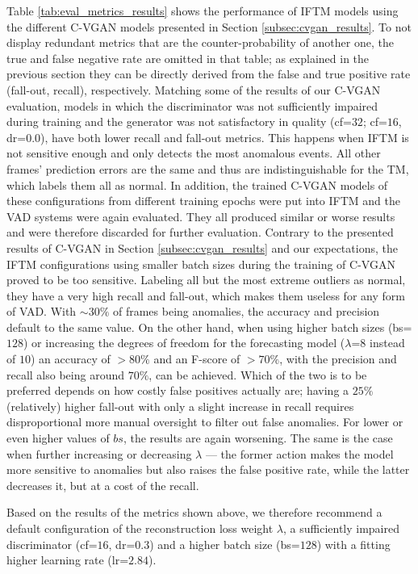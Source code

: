 Table \ref{tab:eval_metrics_results} shows the performance of IFTM models using the different C-VGAN models presented in Section \ref{subsec:cvgan_results}. To not display redundant metrics that are the counter-probability of another one, the true and false negative rate are omitted in that table; as explained in the previous section they can be directly derived from the false and true positive rate (fall-out, recall), respectively. Matching some of the results of our C-VGAN evaluation, models in which the discriminator was not sufficiently impaired during training and the generator was not satisfactory in quality (cf=$32$; cf=$16$, dr=$0.0$), have both lower recall and fall-out metrics. This happens when IFTM is not sensitive enough and only detects the most anomalous events. All other frames' prediction errors are the same and thus are indistinguishable for the TM, which labels them all as normal. In addition, the trained C-VGAN models of these configurations from different training epochs were put into IFTM and the VAD systems were again evaluated. They all produced similar or worse results and were therefore discarded for further evaluation. Contrary to the presented results of C-VGAN in Section \ref{subsec:cvgan_results} and our expectations, the IFTM configurations using smaller batch sizes during the training of C-VGAN proved to be too sensitive. Labeling all but the most extreme outliers as normal, they have a very high recall and fall-out, which makes them useless for any form of VAD. With $\sim 30\%$ of frames being anomalies, the accuracy and precision default to the same value. On the other hand, when using higher batch sizes (bs=$128$) or increasing the degrees of freedom for the forecasting model ($\lambda$=$8$ instead of $10$) an accuracy of $>80\%$ and an F-score of $>70\%$, with the precision and recall also being around $70\%$, can be achieved. Which of the two is to be preferred depends on how costly false positives actually are; having a $25\%$ (relatively) higher fall-out with only a slight increase in recall requires disproportional more manual oversight to filter out false anomalies. For lower or even higher values of $bs$, the results are again worsening. The same is the case when further increasing or decreasing $\lambda$ --- the former action makes the model more sensitive to anomalies but also raises the false positive rate, while the latter decreases it, but at a cost of the recall.

Based on the results of the metrics shown above, we therefore recommend a default configuration of the reconstruction loss weight $\lambda$, a sufficiently impaired discriminator (cf=$16$, dr=$0.3$) and a higher batch size (bs=$128$) with a fitting higher learning rate (lr=$2.8$$4$).

